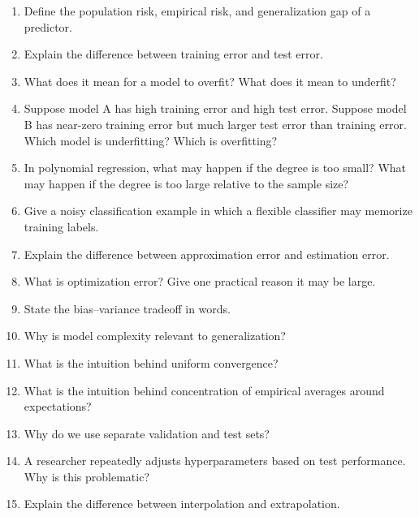 \begin{enumerate}
    \item Define the population risk, empirical risk, and generalization gap of a predictor.

    \item Explain the difference between training error and test error.

    \item What does it mean for a model to overfit? What does it mean to underfit?

    \item Suppose model A has high training error and high test error. Suppose model B has near-zero training error but much larger test error than training error. Which model is underfitting? Which is overfitting?

    \item In polynomial regression, what may happen if the degree is too small? What may happen if the degree is too large relative to the sample size?

    \item Give a noisy classification example in which a flexible classifier may memorize training labels.

    \item Explain the difference between approximation error and estimation error.

    \item What is optimization error? Give one practical reason it may be large.

    \item State the bias--variance tradeoff in words.

    \item Why is model complexity relevant to generalization?

    \item What is the intuition behind uniform convergence?

    \item What is the intuition behind concentration of empirical averages around expectations?

    \item Why do we use separate validation and test sets?

    \item A researcher repeatedly adjusts hyperparameters based on test performance. Why is this problematic?

    \item Explain the difference between interpolation and extrapolation.


\end{enumerate}

